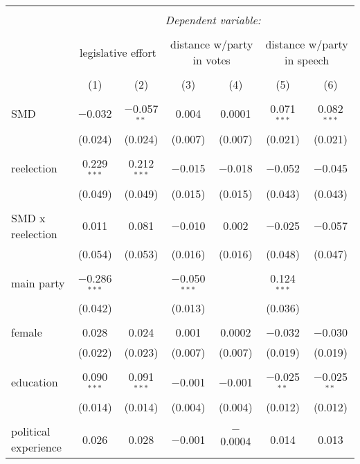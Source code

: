 \documentclass{article}
\begin{document}
\begin{table}[!htbp] \centering 
  \caption{} 
  \label{} 
\begin{tabular}{@{\extracolsep{5pt}}lcccccc} 
\\[-1.8ex]\hline 
\hline \\[-1.8ex] 
 & \multicolumn{6}{c}{\textit{Dependent variable:}} \\ 
\cline{2-7} 
\\[-1.8ex] & \multicolumn{2}{c}{legislative effort} & \multicolumn{2}{c}{distance w/party in votes} & \multicolumn{2}{c}{distance w/party in speech} \\ 
\\[-1.8ex] & (1) & (2) & (3) & (4) & (5) & (6)\\ 
\hline \\[-1.8ex] 
 SMD & $-$0.032 & $-$0.057$^{**}$ & 0.004 & 0.0001 & 0.071$^{***}$ & 0.082$^{***}$ \\ 
  & (0.024) & (0.024) & (0.007) & (0.007) & (0.021) & (0.021) \\ 
  & & & & & & \\ 
 reelection & 0.229$^{***}$ & 0.212$^{***}$ & $-$0.015 & $-$0.018 & $-$0.052 & $-$0.045 \\ 
  & (0.049) & (0.049) & (0.015) & (0.015) & (0.043) & (0.043) \\ 
  & & & & & & \\ 
   SMD x reelection & 0.011 & 0.081 & $-$0.010 & 0.002 & $-$0.025 & $-$0.057 \\ 
  & (0.054) & (0.053) & (0.016) & (0.016) & (0.048) & (0.047) \\ 
  & & & & & & \\ 
 main party & $-$0.286$^{***}$ &  & $-$0.050$^{***}$ &  & 0.124$^{***}$ &  \\ 
  & (0.042) &  & (0.013) &  & (0.036) &  \\ 
  & & & & & & \\ 
 female & 0.028 & 0.024 & 0.001 & 0.0002 & $-$0.032 & $-$0.030 \\ 
  & (0.022) & (0.023) & (0.007) & (0.007) & (0.019) & (0.019) \\ 
  & & & & & & \\ 
 education & 0.090$^{***}$ & 0.091$^{***}$ & $-$0.001 & $-$0.001 & $-$0.025$^{**}$ & $-$0.025$^{**}$ \\ 
  & (0.014) & (0.014) & (0.004) & (0.004) & (0.012) & (0.012) \\ 
  & & & & & & \\ 
 political experience & 0.026 & 0.028 & $-$0.001 & $-$0.0004 & 0.014 & 0.013 \\ 

\end{tabular}
\end{table}
\end{document}
